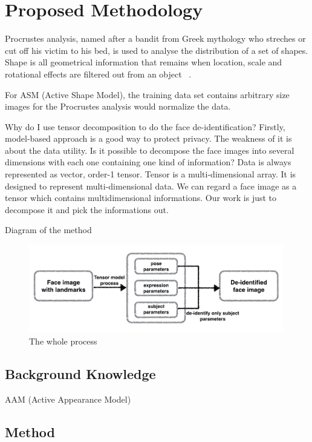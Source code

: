 \chapter{Proposed Methodology}

Procrustes analysis, named after a bandit from Greek mythology who streches or cut off his victim to his bed, is used to analyse the distribution of a set of shapes. Shape is all geometrical information that remains when location, scale and rotational effects are filtered out from an object ~\cite{IMM2002-0403}. 

For ASM (Active Shape Model), the training data set contains arbitrary size images for the Procrustes analysis would normalize the data.

Why do I use tensor decomposition to do the face de-identification? Firstly, model-based approach is a good way to protect privacy. The weakness of it is about the data utility. Is it possible to decompose the face images into several dimensions with each one containing one kind of information? Data is always represented as vector, order-1 tensor. Tensor is a multi-dimensional array. It is designed to represent multi-dimensional data. We can regard a face image as a tensor which contains multidimensional informations. Our work is just to decompose it and pick the informations out. 

Diagram of the method

\begin{figure}
  \centering
  \includegraphics[width=0.99\textwidth]{figure/diagram} 
  \caption{The whole process}
  \label{diagram}
\end{figure}


\section{Background Knowledge}
AAM (Active Appearance Model)


\section{Method}

